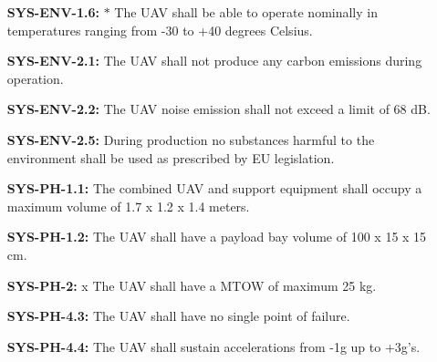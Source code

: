\begin{enumerate}[leftmargin =4.5cm, align=parleft, labelwidth=10em]
    \item[\textbf{SYS-ENV-1.6:} $\ast$ ] The UAV shall be able to operate nominally in temperatures ranging from -30 to +40 degrees Celsius.
    \item[\textbf{SYS-ENV-2.1:} \dag] The UAV shall not produce any carbon emissions during operation. 
    \item[\textbf{SYS-ENV-2.2:}] The UAV noise emission shall not exceed a limit of 68 dB.
    \item[\textbf{SYS-ENV-2.5:}] During production no substances harmful to the environment shall be used as prescribed by EU legislation.
    \item[\textbf{SYS-PH-1.1:} \ddag] The combined UAV and support equipment shall occupy a maximum volume of 1.7 x 1.2 x 1.4 meters. 
    \item[\textbf{SYS-PH-1.2:} \dag] The UAV shall have a payload bay volume of 100 x 15 x 15 cm.    \item[\textbf{SYS-PH-2:} x ] The UAV shall have a MTOW of maximum 25 kg.
    \item[\textbf{SYS-PH-4.3:}] The UAV shall have no single point of failure.
    \item[\textbf{SYS-PH-4.4:}] The UAV shall sustain accelerations from -1g up to +3g’s.


\end{enumerate}
